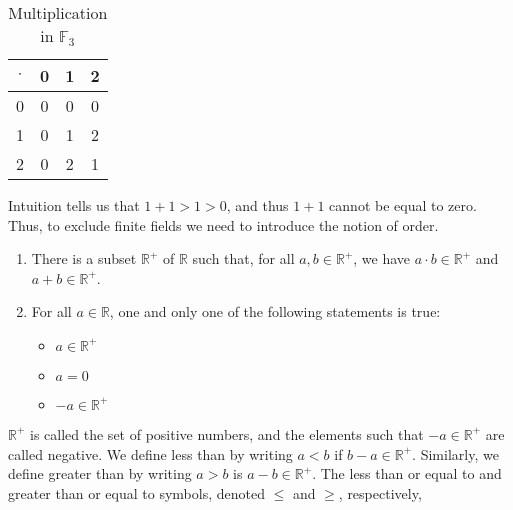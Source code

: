 \documentclass[crop=false,class=book,oneside]{standalone}
\begin{document}
            \hfill
            \begin{minipage}[b]{0.49\textwidth}
                \begin{table}[H]
                    \centering
                    \captionsetup{type=table}
                    \begin{tabular}{c|ccc}
                        $\cdot$&0&1&2\\
                        \hline
                        0&0&0&0\\
                        1&0&1&2\\
                        2&0&2&1
                    \end{tabular}
                    \caption{Multiplication in $\mathbb{F}_{3}$}
                    \label{tab:Real_Analysis_Mult_in_F_3_Field}
                \end{table}
            \end{minipage}
            Intuition tells us that $1+1>1>0$, and thus $1+1$ cannot
            be equal to zero. Thus, to exclude finite fields we
            need to introduce the notion of order.
            \begin{enumerate}
                \item There is a subset $\mathbb{R}^{+}$
                      of $\mathbb{R}$ such that, for all
                      $a,b\in\mathbb{R}^{+}$, we
                      have $a\cdot{b}\in\mathbb{R}^{+}$ and
                      $a+b\in\mathbb{R}^{+}$.
                \item For all $a\in\mathbb{R}$, one and only one of
                      the following statements is true:
                      \begin{itemize}
                          \item $a\in\mathbb{R}^{+}$
                          \item $a=0$
                          \item $\minus{a}\in\mathbb{R}^{+}$
                      \end{itemize}
            \end{enumerate}
            $\mathbb{R}^{+}$ is called the set of positive numbers,
            and the elements such that $\minus{a}\in\mathbb{R}^{+}$
            are called negative. We define less than by writing
            $a<b$ if $b-a\in\mathbb{R}^{+}$. Similarly, we define
            greater than by writing $a>b$ is $a-b\in\mathbb{R}^{+}$.
            The less than or equal to and greater than or equal to
            symbols, denoted $\leq$ and $\geq$, respectively,
\end{document}
